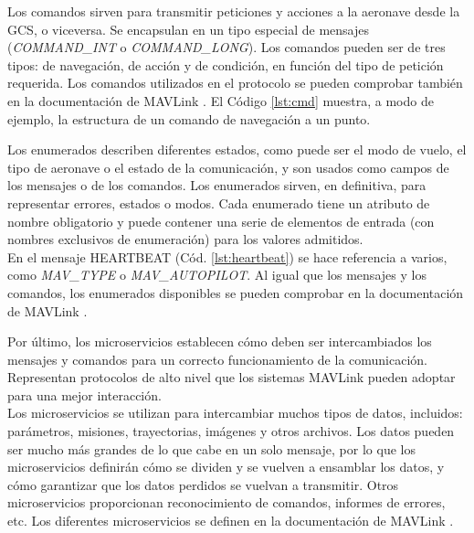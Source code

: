 \documentclass[../main.tex]{subfiles}
\begin{document}


\newpage
Los comandos sirven para transmitir peticiones y acciones a la aeronave desde la GCS, o viceversa. Se encapsulan en un tipo especial de mensajes (\emph{COMMAND\_INT} o \emph{COMMAND\_LONG}). Los comandos pueden ser de tres tipos: de navegación, de acción y de condición, en función del tipo de petición requerida. Los comandos utilizados en el protocolo se pueden comprobar también en la documentación de MAVLink \cite{mavlink-msg}. 
El Código \ref{lst:cmd} muestra, a modo de ejemplo, la estructura de un comando de navegación a un punto.

Los enumerados describen diferentes estados, como puede ser el modo de vuelo, el tipo de aeronave o el estado de la comunicación, y son usados como campos de los mensajes o de los comandos. Los enumerados sirven, en definitiva, para representar errores, estados o modos. Cada enumerado tiene un atributo de nombre obligatorio y puede contener una serie de elementos de entrada (con nombres exclusivos de enumeración) para los valores admitidos. \\
En el mensaje HEARTBEAT (Cód. \ref{lst:heartbeat}) se hace referencia a varios, como \emph{MAV\_TYPE} o \emph{MAV\_AUTOPILOT}. Al igual que los mensajes y los comandos, los enumerados disponibles se pueden comprobar en la documentación de MAVLink \cite{mavlink-msg}.



Por último, los microservicios establecen cómo deben ser intercambiados los mensajes y comandos para un correcto funcionamiento de la comunicación. Representan protocolos de alto nivel que los sistemas MAVLink pueden adoptar para una mejor interacción. \\
Los microservicios se utilizan para intercambiar muchos tipos de datos, incluidos: parámetros, misiones, trayectorias, imágenes y otros archivos. Los datos pueden ser mucho más grandes de lo que cabe en un solo mensaje, por lo que los microservicios definirán cómo se dividen y se vuelven a ensamblar los datos, y cómo garantizar que los datos perdidos se vuelvan a transmitir. Otros microservicios proporcionan reconocimiento de comandos, informes de errores, etc. Los diferentes microservicios se definen en la documentación de MAVLink \cite{mavlink-microserv}.
\end{document}
